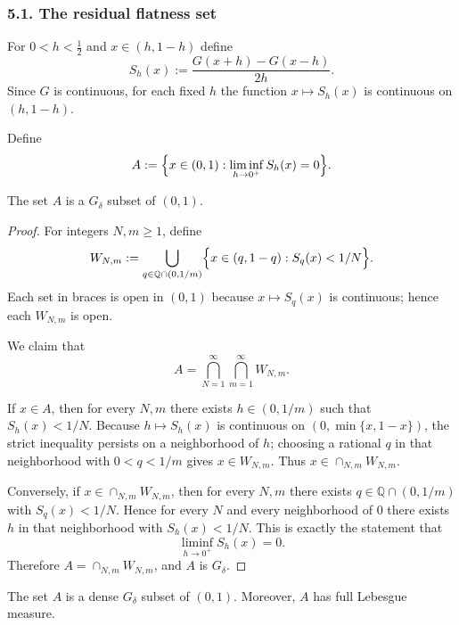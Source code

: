 \subsubsection*{5.1. The residual flatness set}

For $0<h<\tfrac12$ and $x\in(h,1-h)$ define
\[
S_h(x):=\frac{G(x+h)-G(x-h)}{2h}.
\]
Since $G$ is continuous, for each fixed $h$ the function $x\mapsto S_h(x)$ is continuous on $(h,1-h)$.

Define
\[
A:=\Bigl\{x\in(0,1):\liminf_{h\to0^+}S_h(x)=0\Bigr\}.
\]

\begin{lemma}\label{lem:A-Gdelta}
The set $A$ is a $G_\delta$ subset of $(0,1)$.
\end{lemma}

\begin{proof}
For integers $N,m\ge1$, define
\[
W_{N,m}:=\bigcup_{q\in\mathbb Q\cap(0,1/m)}\Bigl\{x\in(q,1-q):S_q(x)<1/N\Bigr\}.
\]
Each set in braces is open in $(0,1)$ because $x\mapsto S_q(x)$ is continuous; hence each $W_{N,m}$ is open.

We claim that
\[
A=\bigcap_{N=1}^\infty\bigcap_{m=1}^\infty W_{N,m}.
\]

If $x\in A$, then for every $N,m$ there exists $h\in(0,1/m)$ such that $S_h(x)<1/N$.
Because $h\mapsto S_h(x)$ is continuous on $(0,\min\{x,1-x\})$, the strict inequality persists on a neighborhood of $h$; choosing a rational $q$ in that neighborhood with $0<q<1/m$ gives $x\in W_{N,m}$. Thus $x\in\cap_{N,m}W_{N,m}$.

Conversely, if $x\in\cap_{N,m}W_{N,m}$, then for every $N,m$ there exists $q\in\mathbb Q\cap(0,1/m)$ with $S_q(x)<1/N$. Hence for every $N$ and every neighborhood of $0$ there exists $h$ in that neighborhood with $S_h(x)<1/N$. This is exactly the statement that
\[
\liminf_{h\to0^+}S_h(x)=0.
\]
Therefore $A=\cap_{N,m}W_{N,m}$, and $A$ is $G_\delta$.
\end{proof}

\begin{theorem}\label{thm:A-residual}
The set $A$ is a dense $G_\delta$ subset of $(0,1)$. Moreover, $A$ has full Lebesgue measure.
\end{theorem}


